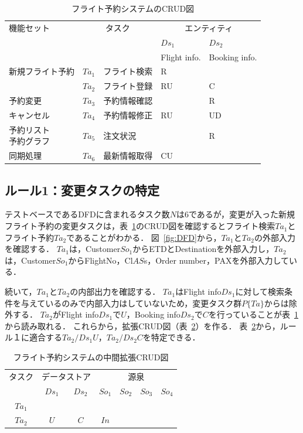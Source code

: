 \documentclass[a4paper,11pt]{jreport}
\begin{document}
\begin{table}[t]
\caption{フライト予約システムのCRUD図}
\label{CRUD}
\begin{center}
{\footnotesize
\begin{tabular}{p{1.7 cm}|c|p{1.5 cm}||p{1 cm}|p{1cm}}
\hline
機能セット&\multicolumn{2}{c||}{タスク}&\multicolumn{2}{c}{エンティティ}\\
&\multicolumn{2}{c||}{}&$Ds_1$&$Ds_2$\\
&\multicolumn{2}{c||}{}&Flight info.&Booking info.\\
\cline{4-5}
\hline\hline
新規フライト予約&$Ta_1$&フライト検索&R&\\
\cline{2-5}
&$Ta_2$&フライト登録&RU&C\\
\hline
予約変更&$Ta_3$&予約情報確認&&R\\
\cline{2-5}
キャンセル&$Ta_4$&予約情報修正&RU&UD\\
\hline
\shortstack{予約リスト\\予約グラフ}&$Ta_5$&注文状況&&R\\
\hline
\cline{2-5}
同期処理&$Ta_6$&最新情報取得&CU&\\
\hline
\end{tabular}
}
\end{center}
\end{table}%


\subsection{ルール1：変更タスクの特定}
テストベースであるDFDに含まれるタスク数$N$は6であるが，変更が入った新規フライト予約の変更タスクは，表~\ref{CRUD}のCRUD図を確認するとフライト検索$Ta_1$とフライト予約$Ta_2$であることがわかる．
図~\ref{fig:DFD}から，$Ta_1$と$Ta_2$の外部入力を確認する．
$Ta_1$は，Customer$So_1$からETDとDestinationを外部入力し，$Ta_2$は，Customer$So_1$からFlightNo，Cl$AS$s，Order number，PAXを外部入力している．

続いて，$Ta_1$と$Ta_2$の内部出力を確認する．
$Ta_1$はFlight info$Ds_1$に対して検索条件を与えているのみで内部入力はしていないため，変更タスク群$P\{Ta\}$からは除外する．
$Ta_2$がFlight info$Ds_1$で$U$，Booking info$Ds_2$で$C$を行っていることが表~\ref{CRUD}から読み取れる．
これらから，拡張CRUD図（表~\ref{ECRUD1}）を作る．
表~\ref{ECRUD1}から，ルール１に適合する$Ta_2/Ds_1U$，$Ta_2/Ds_2C$を特定できる．

\begin{table}[t]
\caption{フライト予約システムの中間拡張CRUD図}
\label{ECRUD1}
\begin{center}
\begin{tabular}{c||c|c||c|c|c|c}
\hline
タスク&\multicolumn{2}{c||}{データストア}&\multicolumn{4}{c}{源泉}\\
&$Ds_1$&$Ds_2$&$So_1$&$So_2$&$So_3$&$So_4$\\
\hline\hline
$Ta_1$&&&&&&\\
\hline
$Ta_2$&$U$&$C$&$In$&&&\\
\hline
\end{tabular}
\end{center}
\end{table}%
\end{document}
